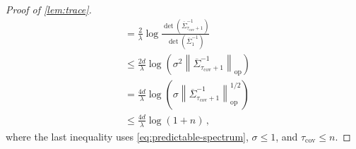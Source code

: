 \documentclass[11pt]{article}
\newcommand{\op}{\mathrm{op}}
\newcommand{\1}{\mathbf 1}
\newcommand{\norm}[1]{\left\lVert #1\right\rVert}
\begin{document}
\begin{proof}[Proof of \cref{lem:trace}]
\begin{align}
         & =
        \frac2\lambda
        \log\frac{\det(\overline\Sigma_{\tau_{\mathrm{cov}}+1}^{-1})}
        {\det(\overline\Sigma_1^{-1})} \\
         & \leq
        \frac{2d}{\lambda}
        \log\left(
        \sigma^2
        \norm{\overline\Sigma_{\tau_{\mathrm{cov}}+1}^{-1}}_{\op}
        \right)                        \\
         & =
        \frac{4d}{\lambda}
        \log\left(
        \sigma
        \norm{\overline\Sigma_{\tau_{\mathrm{cov}}+1}^{-1}}_{\op}^{1/2}
        \right)                        \\
         & \leq
        \frac{4d}{\lambda}
        \log\left(1+n\right)\,,
    \end{align}
    where the last inequality
    uses \eqref{eq:predictable-spectrum},
    $\sigma\leq1$, and $\tau_{\mathrm{cov}}\leq n$.
\end{proof}
\end{document}

